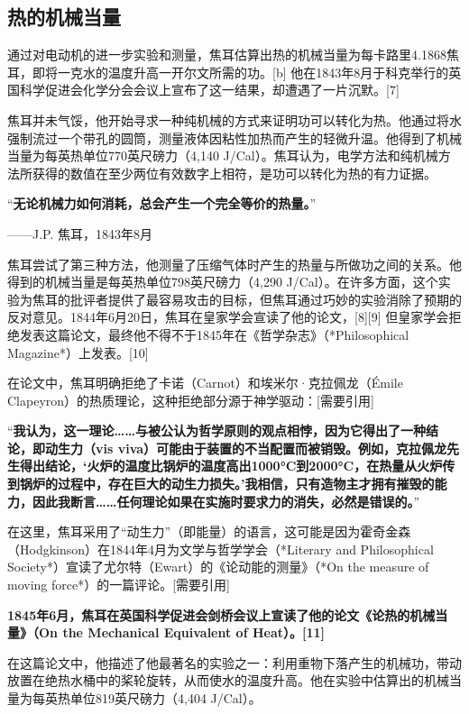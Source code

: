 \subsection{热的机械当量}  
通过对电动机的进一步实验和测量，焦耳估算出热的机械当量为每卡路里4.1868焦耳，即将一克水的温度升高一开尔文所需的功。[b] 他在1843年8月于科克举行的英国科学促进会化学分会会议上宣布了这一结果，却遭遇了一片沉默。[7]  

焦耳并未气馁，他开始寻求一种纯机械的方式来证明功可以转化为热。他通过将水强制流过一个带孔的圆筒，测量液体因粘性加热而产生的轻微升温。他得到了机械当量为每英热单位770英尺磅力（4,140 J/Cal）。焦耳认为，电学方法和纯机械方法所获得的数值在至少两位有效数字上相符，是功可以转化为热的有力证据。  

“\textbf{无论机械力如何消耗，总会产生一个完全等价的热量。}”

——J.P. 焦耳，1843年8月  

焦耳尝试了第三种方法，他测量了压缩气体时产生的热量与所做功之间的关系。他得到的机械当量是每英热单位798英尺磅力（4,290 J/Cal）。在许多方面，这个实验为焦耳的批评者提供了最容易攻击的目标，但焦耳通过巧妙的实验消除了预期的反对意见。1844年6月20日，焦耳在皇家学会宣读了他的论文，[8][9] 但皇家学会拒绝发表这篇论文，最终他不得不于1845年在《哲学杂志》（*Philosophical Magazine*）上发表。[10]  

在论文中，焦耳明确拒绝了卡诺（Carnot）和埃米尔·克拉佩龙（Émile Clapeyron）的热质理论，这种拒绝部分源于神学驱动：[需要引用]  

“\textbf{我认为，这一理论……与被公认为哲学原则的观点相悖，因为它得出了一种结论，即动生力（vis viva）可能由于装置的不当配置而被销毁。例如，克拉佩龙先生得出结论，‘火炉的温度比锅炉的温度高出1000°C到2000°C，在热量从火炉传到锅炉的过程中，存在巨大的动生力损失。’我相信，只有造物主才拥有摧毁的能力，因此我断言……任何理论如果在实施时要求力的消失，必然是错误的。}”

在这里，焦耳采用了“动生力”（即能量）的语言，这可能是因为霍奇金森（Hodgkinson）在1844年4月为文学与哲学学会（*Literary and Philosophical Society*）宣读了尤尔特（Ewart）的《论动能的测量》（*On the measure of moving force*）的一篇评论。[需要引用]  

\textbf{1845年6月，焦耳在英国科学促进会剑桥会议上宣读了他的论文《论热的机械当量》（On the Mechanical Equivalent of Heat）。[11] }

在这篇论文中，他描述了他最著名的实验之一：利用重物下落产生的机械功，带动放置在绝热水桶中的桨轮旋转，从而使水的温度升高。他在实验中估算出的机械当量为每英热单位819英尺磅力（4,404 J/Cal）。  

